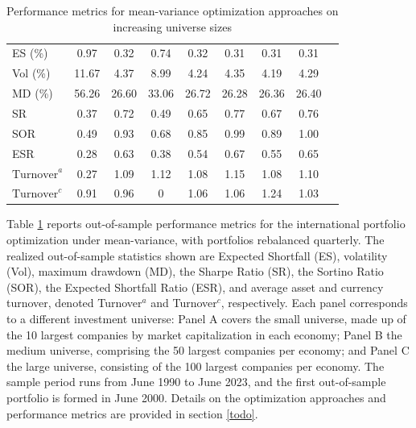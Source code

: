\begin{table}[htbp]
{\begin{tabular}{lcccccccc}
    ES (\%)                     & 0.97                      & 0.32                & 0.74                & 0.32              & 0.31              & 0.31             & 0.31 \\
    Vol (\%)                    & 11.67                     & 4.37                & 8.99                & 4.24              & 4.35              & 4.19             & 4.29 \\
    MD (\%)                     & 56.26                     & 26.60               & 33.06               & 26.72             & 26.28             & 26.36            & 26.40\\
    SR                          & 0.37                      & 0.72                & 0.49                & 0.65              & 0.77              & 0.67             & 0.76\\
    SOR                         & 0.49                      & 0.93                & 0.68                & 0.85              & 0.99              & 0.89             & 1.00\\
    ESR                         & 0.28                      & 0.63                & 0.38                & 0.54              & 0.67              & 0.55             & 0.65\\
    $\text{Turnover}^a$         & 0.27                      & 1.09                & 1.12                & 1.08              & 1.15              & 1.08             & 1.10\\
    $\text{Turnover}^c$         & 0.91                      & 0.96                & 0                   & 1.06              & 1.06              & 1.24             & 1.03\\
    \bottomrule
  \end{tabular}%
}
  \caption{Performance metrics for mean-variance optimization approaches on increasing universe sizes}
  \label{tab:mv-universe-sizes}
   \vspace{0.5em}
  \begin{minipage}{\textwidth}
  \raggedright\small
    Table \ref{tab:mv-universe-sizes} reports out-of-sample performance metrics for the international
  portfolio optimization under mean-variance, with portfolios rebalanced
  quarterly. The realized out-of-sample statistics shown are Expected Shortfall (ES), volatility (Vol),
  maximum drawdown (MD), the Sharpe Ratio (SR), the Sortino Ratio (SOR), the Expected Shortfall Ratio (ESR), 
  and average asset and currency turnover, denoted Turnover$^a$ and Turnover$^c$, respectively. 
  Each panel corresponds to a different investment universe:
  Panel A covers the small universe, made up of the 10 largest companies by market
  capitalization in each economy; Panel B the medium universe, comprising the 50 largest
  companies per economy; and Panel C the large universe, consisting of the 100 largest
  companies per economy. The sample period runs from June 1990 to June 2023, and the
  first out-of-sample portfolio is formed in June 2000. Details on the optimization approaches and 
    performance metrics are provided in section \ref{todo}.
  \end{minipage}
\end{table}

